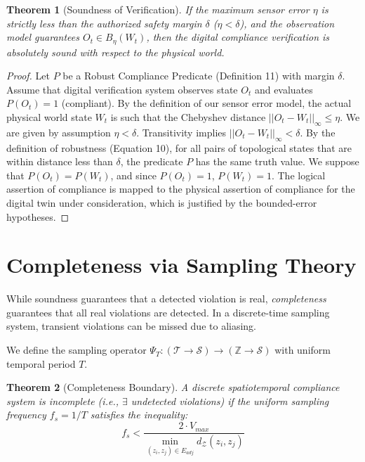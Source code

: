 \documentclass[conference]{IEEEtran}
\newtheorem{theorem}{Theorem}
\newcommand{\Z}{\mathcal{Z}} %
\newcommand{\T}{\mathcal{T}} %
\newcommand{\Sstate}{\mathcal{S}} %
\begin{document}
\begin{theorem}[Soundness of Verification]
If the maximum sensor error $\eta$ is strictly less than the authorized safety margin $\delta$ ($\eta < \delta$), and the observation model guarantees $O_t \in B_\eta(W_t)$, then the digital compliance verification is absolutely sound with respect to the physical world.
\end{theorem}

\begin{proof}
Let $P$ be a Robust Compliance Predicate (Definition 11) with margin $\delta$. Assume that digital verification system observes state $O_t$ and evaluates $P(O_t) = 1$ (compliant). By the definition of our sensor error model, the actual physical world state $W_t$ is such that the Chebyshev distance $||O_t - W_t||_\infty \le \eta$. We are given by assumption $\eta < \delta$. Transitivity implies $||O_t - W_t||_\infty < \delta$. By the definition of robustness (Equation 10), for all pairs of topological states that are within distance less than $\delta$, the predicate $P$ has the same truth value. We suppose that $P(O_t) = P(W_t)$, and since $P(O_t) = 1$, $P(W_t) = 1$. The logical assertion of compliance is mapped to the physical assertion of compliance for the digital twin under consideration, which is justified by the bounded-error hypotheses.
\end{proof}

\section{Completeness via Sampling Theory}

While soundness guarantees that a detected violation is real, \textit{completeness} guarantees that all real violations are detected. In a discrete-time sampling system, transient violations can be missed due to aliasing.

We define the sampling operator $\Psi_T: (\T \to \Sstate) \to (\mathbb{Z} \to \Sstate)$ with uniform temporal period $T$.

\begin{theorem}[Completeness Boundary]
A discrete spatiotemporal compliance system is incomplete (i.e., $\exists$ undetected violations) if the uniform sampling frequency $f_s = 1/T$ satisfies the inequality:
\begin{equation}
f_s < \frac{2 \cdot V_{max}}{\min_{(z_i, z_j) \in E_{adj}} d_\Z(z_i, z_j)}
\end{equation}
\end{theorem}
\end{document}
